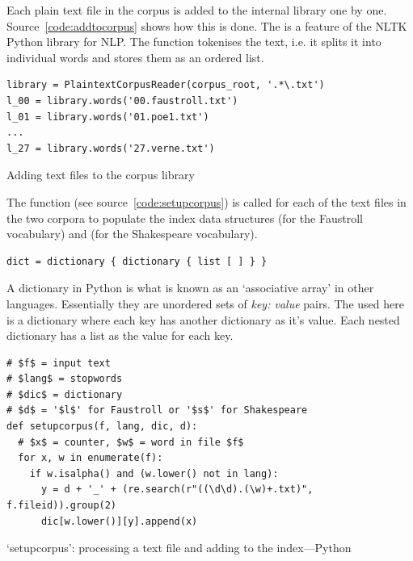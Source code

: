 Each plain text file in the corpus is added to the internal library one by one. Source~\ref{code:addtocorpus} shows how this is done. The  is a feature of the \ac{NLTK} Python library \autocite{NLTK2016} for \acf{NLP}. The  function tokenises the text, i.e. it splits it into individual words and stores them as an ordered list.

\begin{listing}[!htbp] %
  \begin{verbatim}
library = PlaintextCorpusReader(corpus_root, '.*\.txt')
l_00 = library.words('00.faustroll.txt')
l_01 = library.words('01.poe1.txt')
...
l_27 = library.words('27.verne.txt')
  \end{verbatim}
\caption{Adding text files to the corpus library}
\label{code:addtocorpus}
\end{listing}

The  function (see source~\ref{code:setupcorpus}) is called for each of the text files in the two corpora to populate the index data structures  (for the Faustroll vocabulary) and  (for the Shakespeare vocabulary).

\begin{verbatim}
dict = dictionary { dictionary { list [ ] } }
\end{verbatim}

A dictionary in Python is what is known as an `associative array' in other languages. Essentially they are unordered sets of \emph{key: value} pairs. The  used here is a dictionary where each key has another dictionary as it's value. Each nested dictionary has a list as the value for each key.

\begin{listing}[!htbp] %
  \begin{verbatim}
# $f$ = input text
# $lang$ = stopwords
# $dic$ = dictionary
# $d$ = '$l$' for Faustroll or '$s$' for Shakespeare
def setupcorpus(f, lang, dic, d):
  # $x$ = counter, $w$ = word in file $f$
  for x, w in enumerate(f):
    if w.isalpha() and (w.lower() not in lang):
      y = d + '_' + (re.search(r"((\d\d).(\w)+.txt)", f.fileid)).group(2)
      dic[w.lower()][y].append(x)
  \end{verbatim}
\caption[`setupcorpus' function---Python]{`setupcorpus': processing a text file and adding to the index---Python}
\label{code:setupcorpus}
\end{listing}

